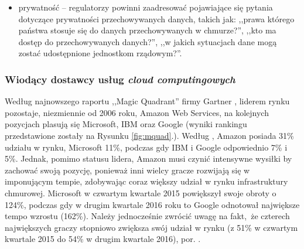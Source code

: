 \documentclass[12pt,a4paper,twoside]{article}
\begin{document}
\begin{itemize}
\item prywatność -- regulatorzy powinni zaadresować pojawiające się pytania dotyczące prywatności przechowywanych danych, takich jak: ,,prawa którego państwa stosuje się do danych przechowywanych w chmurze?'', ,,kto ma dostęp do przechowywanych danych?'', ,,w jakich sytuacjach dane mogą zostać udostępnione jednostkom rządowym?''.
\end{itemize}

\subsubsection{Wiodący dostawcy usług \textit{cloud computingowych}}

\noindent
Według najnowszego raportu ,,Magic Quadrant'' firmy Gartner \citep{leong2017}, liderem rynku pozostaje, niezmiennie od 2006 roku, Amazon Web Services, na kolejnych pozycjach plasują się Microsoft, IBM oraz Google (wyniki rankingu przedstawione zostały na Rysunku \ref{fig:mquad}.). Według \citet{forbes2017}, Amazon posiada 31\% udziału w rynku, Microsoft 11\%, podczas gdy IBM i Google odpowiednio 7\% i 5\%. Jednak, pomimo statusu lidera, Amazon musi czynić intensywne wysiłki by zachować swoją pozycję, ponieważ inni wielcy gracze rozwijają się w imponującym tempie, zdobywając coraz większy udział w rynku infrastruktury chmurowej. Microsoft w czwartym kwartale 2015 powiększył swoje obroty o 124\%, podczas gdy w drugim kwartale 2016 roku to Google odnotował największe tempo wzrostu (162\%). Należy jednocześnie zwrócić uwagę na fakt, że czterech największych graczy stopniowo zwiększa swój udział w rynku (z 51\% w czwartym kwartale 2015 do 54\% w drugim kwartale 2016), por. \citet{forbes2017}.
\end{document}
